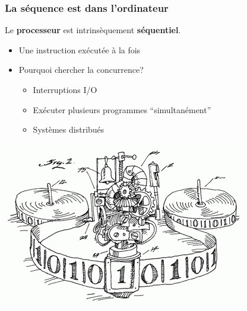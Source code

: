 \documentclass{beamer}
\begin{document}
\begin{frame}
  \frametitle{La séquence est dans l'ordinateur}
  Le \textbf{processeur} est intrinsèquement \textbf{séquentiel}.\par\bigskip
  \begin{minipage}{.55\textwidth}
    \begin{itemize}
    \item Une instruction exécutée à la fois
    \item<2-> Pourquoi chercher la concurrence?
      \begin{itemize}
      \item<3-> Interruptions I/O
      \item<4-> Exécuter plusieurs programmes ``simultanément''
      \item<5-> Systèmes distribués
      \end{itemize}
    \end{itemize}
  \end{minipage}\quad
  \begin{minipage}{.4\textwidth}
    \begin{center}
      \includegraphics[width=.8\textwidth]{turing.png}
    \end{center}
  \end{minipage}
\end{frame} %
\end{document}
